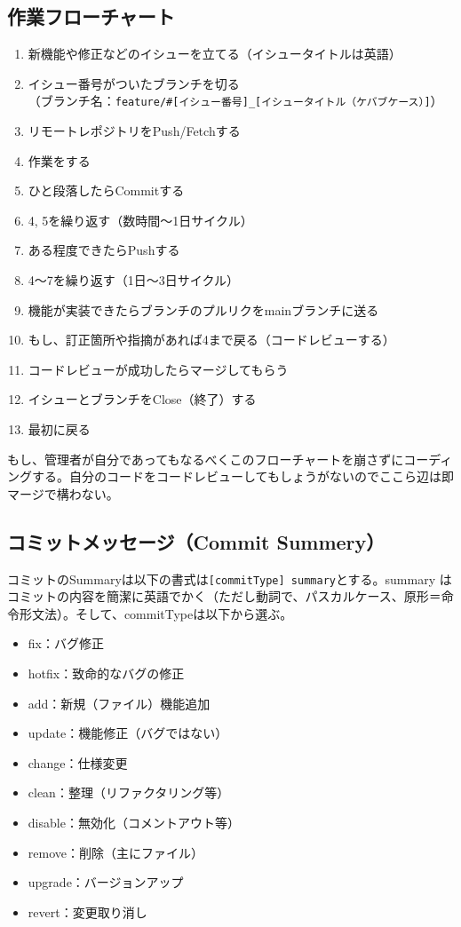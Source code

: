 \documentclass[a4paper]{ltjsreport}
\newcommand{\terlogy}[2][|]{\colorbox{terlogy}{\texttt{\lstinline#1#2#1}}}
\begin{document}
\subsection{作業フローチャート}
\begin{enumerate}
  \item 新機能や修正などのイシューを立てる（イシュータイトルは英語）
  \item イシュー番号がついたブランチを切る\\
        （ブランチ名：\verb|feature/#[イシュー番号]_[イシュータイトル（ケバブケース）]|）
  \item リモートレポジトリをPush/Fetchする
  \item 作業をする
  \item ひと段落したらCommitする
  \item 4, 5を繰り返す（数時間〜1日サイクル）
  \item ある程度できたらPushする
  \item 4〜7を繰り返す（1日〜3日サイクル）
  \item 機能が実装できたらブランチのプルリクをmainブランチに送る
  \item もし、訂正箇所や指摘があれば4まで戻る（コードレビューする）
  \item コードレビューが成功したらマージしてもらう
  \item イシューとブランチをClose（終了）する
  \item 最初に戻る
\end{enumerate}
もし、管理者が自分であってもなるべくこのフローチャートを崩さずにコーディングする。自分のコードをコードレビューしてもしょうがないのでここら辺は即マージで構わない。
\subsection{コミットメッセージ（Commit Summery）}
コミットのSummaryは以下の書式は\terlogy{[commitType] summary}とする。summary はコミットの内容を簡潔に英語でかく（ただし動詞で、パスカルケース、原形＝命令形文法）。そして、commitTypeは以下から選ぶ。

\begin{itemize}
  \item fix：バグ修正
  \item hotfix：致命的なバグの修正
  \item add：新規（ファイル）機能追加
  \item update：機能修正（バグではない）
  \item change：仕様変更
  \item clean：整理（リファクタリング等）
  \item disable：無効化（コメントアウト等）
  \item remove：削除（主にファイル）
  \item upgrade：バージョンアップ
  \item revert：変更取り消し
\end{itemize}
\end{document}
